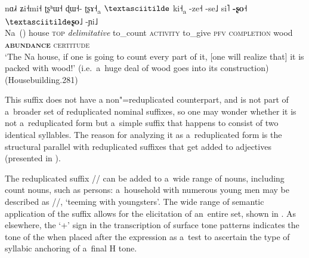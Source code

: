\begin{exe}
	\ex
	\label{ex:Housebuilding281}
	\\
	\gll nɑ˩˧		ʑi˧mi˧		ʈʂʰɯ˧						ɖɯ˧-			ʈʂɤ˧\textsubscript{a}	$\textasciitilde$	ki˧\textsubscript{a}		-ze˧	-se˩	si˥		\textbf{-ʂo˧$\textasciitilde$ʂo˩}	-ɲi˩\\
	Na~()	house		\textsc{top}		\textit{delimitative}		to\_count	\textsc{activity}	to\_give		\textsc{pfv}	\textsc{completion}		wood		\textbf{\textsc{abundance}}	\textsc{certitude}\\
	\glt ‘The Na house, if one is going to count every part of it, [one will realize that] it is packed with wood!' (i.e.\ a~huge deal of wood goes into its construction) (Housebuilding.281)
\end{exe}

This suffix does not have a non"=reduplicated counterpart, and is not part of a~broader set of reduplicated nominal suffixes, so one may wonder whether it is not a~reduplicated form but a~simple suffix that happens to consist of two identical syllables. 
The reason for analyzing it as a~reduplicated form is the structural parallel with reduplicated suffixes that get added to adjectives (presented in ). 

The reduplicated suffix // can be added to a~wide range of
nouns, including count nouns, such as persons: a~household with numerous young men may be described
as //, ‘teeming with youngsters’. The wide range of semantic application of the
suffix allows for the elicitation of an~entire set, shown in . As elsewhere, the ‘+’ sign in the transcription of surface tone
patterns indicates the tone of the  when placed after the expression as a~test to ascertain
the type of syllabic {anchoring} of a~final H tone.

